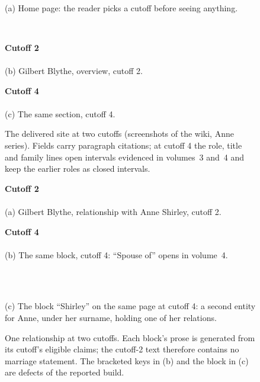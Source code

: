 \begin{figure}[p]
\centering
\begin{minipage}[t]{0.62\textwidth}\centering
{}\\[2pt]
{\small (a) Home page: the reader picks a cutoff before seeing anything.}
\end{minipage}\\[10pt]
\begin{minipage}[t]{0.485\textwidth}\centering
{\small\bfseries Cutoff 2}\\[2pt]
\\[2pt]
{\small (b) Gilbert Blythe, overview, cutoff 2.}
\end{minipage}\hfill
\begin{minipage}[t]{0.485\textwidth}\centering
{\small\bfseries Cutoff 4}\\[2pt]
\\[2pt]
{\small (c) The same section, cutoff 4.}
\end{minipage}
\caption{The delivered site at two cutoffs (screenshots of the \sys wiki, Anne series).
Fields carry paragraph citations; at cutoff 4 the role, title and family lines
open intervals evidenced in volumes~3 and~4 and keep the earlier roles as closed intervals.}
\label{fig:qual-overview}
\end{figure}

\begin{figure}[p]
\centering
\begin{minipage}[t]{0.485\textwidth}\centering
{\small\bfseries Cutoff 2}\\[2pt]
\\[2pt]
{\small (a) Gilbert Blythe, relationship with Anne Shirley, cutoff 2.}
\end{minipage}\hfill
\begin{minipage}[t]{0.485\textwidth}\centering
{\small\bfseries Cutoff 4}\\[2pt]
\\[2pt]
{\small (b) The same block, cutoff 4: ``Spouse of'' opens in volume~4.}
\end{minipage}\\[10pt]
\begin{minipage}[t]{0.485\textwidth}\centering
{}\\[2pt]
{\small (c) The block ``Shirley'' on the same page at cutoff 4: a second entity for Anne,
under her surname, holding one of her relations.}
\end{minipage}
\caption{One relationship at two cutoffs. Each block's prose is generated from its cutoff's
eligible claims; the cutoff-2 text therefore contains no marriage statement. The
bracketed keys in (b) and the block in (c) are defects of the reported build.}
\label{fig:qual-rel}
\end{figure}
